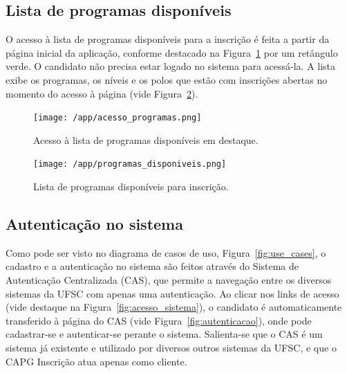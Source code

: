 \documentclass[
  10.5pt,				  %
	openright,			%
	twoside,			  %
  a5paper,
  chapter=TITLE,	%
	section=TITLE,	%
  hyphens,        %
	english,        %
	brazil          %
]{abntex2}
\begin{document}
\subsection{Lista de programas disponíveis}\label{sec:programas_disponiveis}
O acesso à lista de programas disponíveis para a inscrição é feita a partir da página inicial da aplicação, conforme destacado na Figura~\ref{fig:acesso_programas} por um retângulo verde. O candidato não precisa estar logado no sistema para acessá-la. A lista exibe os programas, os níveis e os polos que estão com inscrições abertas no momento do acesso à página (vide Figura~\ref{fig:programas_disponiveis}).

\begin{figure}[!ht]
  \caption{\label{fig:acesso_programas} Acesso à lista de programas disponíveis em destaque. }
  \begin{center}
    \texttt{[image: /app/acesso\_programas.png]}
  \end{center}
\end{figure}



\begin{figure}[!ht]
  \caption{\label{fig:programas_disponiveis} Lista de programas disponíveis para inscrição. }
  \begin{center}
    \texttt{[image: /app/programas\_disponiveis.png]}
  \end{center}
\end{figure}




\subsection{Autenticação no sistema}\label{sec:autenticacao}
Como pode ser visto no diagrama de casos de uso, Figura~\ref{fig:use_cases}, o cadastro e a autenticação no sistema são feitos através do Sistema de Autenticação Centralizada (CAS), que permite a navegação entre os diversos sistemas da UFSC com apenas uma autenticação. Ao clicar nos links de acesso (vide destaque na Figura~\ref{fig:acesso_sistema}), o candidato é automaticamente transferido à página do CAS (vide Figura~\ref{fig:autenticacao}), onde pode cadastrar-se e autenticar-se perante o sistema. Salienta-se que o CAS é um sistema já existente e utilizado por diversos outros sistemas da UFSC, e que o CAPG Inscrição atua apenas como cliente.
\end{document}
